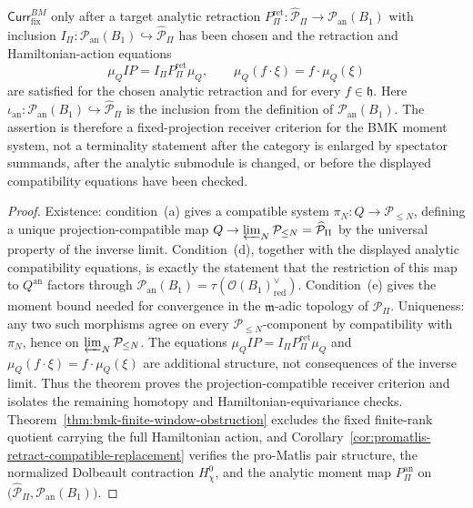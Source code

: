 \begin{thm}
  \(\mathsf{Curr}^{BM}_{\mathrm{fix}}\) only after a target analytic
  retraction
  \(P^{\mathrm{ret}}_\Pi\colon\widehat{\mathcal P}_\Pi\to
  \mathcal P_{\mathrm{an}}(B_1)\) with inclusion
  \(I_\Pi\colon\mathcal P_{\mathrm{an}}(B_1)\hookrightarrow
  \widehat{\mathcal P}_\Pi\) has been chosen and the retraction and
  Hamiltonian-action equations
  \[
    \mu_QIP=I_\Pi P^{\mathrm{ret}}_\Pi\mu_Q,\qquad
    \mu_Q(f\cdot\xi)=f\cdot\mu_Q(\xi)
  \]
  are satisfied for the chosen analytic retraction and for every
  \(f\in\mathfrak h\).  Here
  \(\iota_{\mathrm{an}}\colon\mathcal P_{\mathrm{an}}(B_1)
  \hookrightarrow\widehat{\mathcal P}_\Pi\) is the inclusion from the
  definition of \(\mathcal P_{\mathrm{an}}(B_1)\).  The assertion is
  therefore a fixed-projection
  receiver criterion for the BMK moment system, not a terminality
  statement after the category is enlarged by spectator summands, after
  the analytic submodule is changed, or before the displayed
  compatibility equations have been checked.
\end{thm}

\begin{proof}
  Existence: condition~(a) gives a compatible system
  \(\pi_N\colon Q\to\mathcal P_{\le N}\), defining a unique
  projection-compatible map
  \(Q\to\varprojlim_N\mathcal P_{\le N}=\widehat{\mathcal P}_\Pi\) by
  the universal property of the inverse limit.  Condition~(d), together
  with the displayed analytic compatibility equations, is exactly the
  statement that the restriction of this map to \(Q^{\mathrm{an}}\)
  factors through
  \(\mathcal P_{\mathrm{an}}(B_1)=
  \tau(\mathcal O(B_1)^\vee_{\mathrm{red}})\).  Condition~(e) gives the
  moment bound needed for convergence in the
  \(\mathfrak m\)-adic topology of \(\widehat{\mathcal P}_\Pi\).
  Uniqueness: any two such morphisms agree on every
  \(\mathcal P_{\le N}\)-component by compatibility with \(\pi_N\),
  hence on \(\varprojlim_N\mathcal P_{\le N}\).  The equations
  \(\mu_QIP=I_\Pi P^{\mathrm{ret}}_\Pi\mu_Q\) and
  \(\mu_Q(f\cdot\xi)=f\cdot\mu_Q(\xi)\) are additional structure, not
  consequences of the inverse limit.  Thus the theorem proves the
  projection-compatible receiver criterion and isolates the remaining
  homotopy and Hamiltonian-equivariance checks.
  Theorem~\ref{thm:bmk-finite-window-obstruction} excludes the fixed
  finite-rank quotient carrying the full Hamiltonian action, and
  Corollary~\ref{cor:promatlis-retract-compatible-replacement} verifies the
  pro-Matlis pair structure, the normalized Dolbeault contraction
  \(H^0_\chi\), and the analytic moment map \(P^{\mathrm{an}}_\Pi\)
  on \(\bigl(\widehat{\mathcal P}_\Pi,\mathcal P_{\mathrm{an}}(B_1)\bigr)\).
\end{proof}

